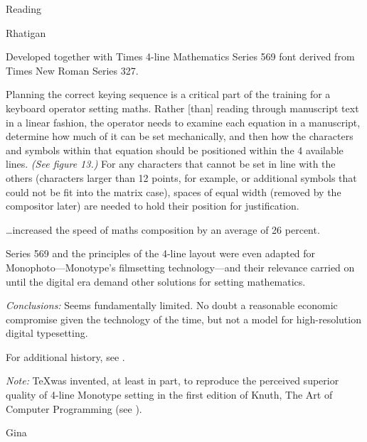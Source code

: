 \documentclass[11pt]{PalisadesLakesBook}
\begin{document}
\begin{plSection}{Reading}
\begin{plSection}{Rhatigan}
\begin{plSection}{}
Developed together with Times 4-line Mathematics Series 569 font
derived from Times New Roman Series 327. 

\begin{plQuote}{}
{}
Planning the correct keying sequence is a critical part of the
training for a keyboard operator setting maths.
Rather [than] reading through manuscript text 
in a linear fashion,
the operator needs to examine each equation in a manuscript,
determine how much of it can be set mechanically,
and then how the characters and symbols within that equation
should be positioned within the 4 available lines. 
\textit{(See figure 13.)}
For any characters that cannot be set in line with the others
(characters larger than 12 points, for example,
or additional symbols that could not be fit into the matrix case),
spaces of equal width (removed by the compositor later)
are needed to hold their position for justification.
\end{plQuote}

\begin{plQuote}{}
{}
\ldots increased the speed of maths composition 
by an average of 26 percent.
\end{plQuote}

\begin{plQuote}{}
{}
Series 569 and the principles of the 4-line layout 
were even adapted for Monophoto---Monotype's 
filmsetting technology---and their relevance carried on 
until the digital era demand other solutions 
for setting mathematics.
\end{plQuote}

\emph{Conclusions:}
Seems fundamentally limited. 
No doubt a reasonable economic compromise given the technology of
the time, but not a model for high-resolution digital typesetting.

For additional history, see
.

\emph{Note:} \TeX was invented, at least in part, 
to reproduce the perceived superior quality 
of 4-line Monotype setting
in the first edition of Knuth, The Art of Computer Programming
(see ).

\end{plSection}%
\begin{plSection}{Gina}


\end{plSection}
\end{plSection}
\end{plSection}
\end{document}
